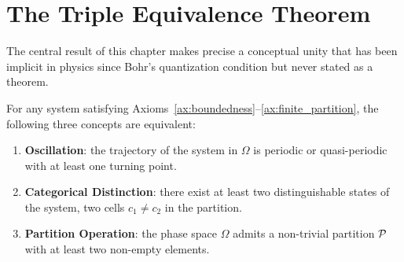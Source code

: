 \section{The Triple Equivalence Theorem}
\label{sec:triple_equivalence}

The central result of this chapter makes precise a conceptual unity that has
been implicit in physics since Bohr's quantization condition but never stated
as a theorem.

\begin{theorem}
\label{thm:triple_equivalence}
For any system satisfying Axioms~\ref{ax:boundedness}--\ref{ax:finite_partition},
the following three concepts are equivalent:
\begin{enumerate}[label=(\roman*)]
  \item \textbf{Oscillation}: the trajectory of the system in $\Omega$ is
        periodic or quasi-periodic with at least one turning point.
  \item \textbf{Categorical Distinction}: there exist at least two distinguishable
        states of the system, \ie two cells $c_1 \neq c_2$ in the partition.
  \item \textbf{Partition Operation}: the phase space $\Omega$ admits a
        non-trivial partition $\mathcal{P}$ with at least two non-empty elements.
\end{enumerate}
\end{theorem}

